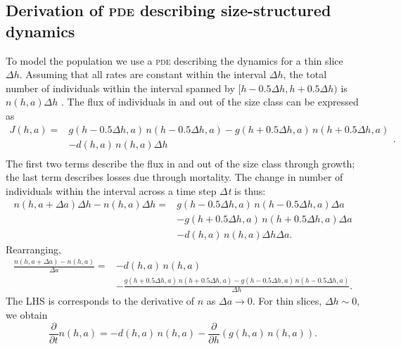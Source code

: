 \documentclass[10pt,twoside]{article}
\begin{document}
\subsection{Derivation of \textsc{pde} describing size-structured
dynamics}\label{derivation-of-pde-describing-size-structured-dynamics}

To model the population we use a \textsc{pde} describing the dynamics for a thin
slice \(\Delta h\). Assuming that all rates are constant within the
interval \(\Delta h\), the total number of individuals within the
interval spanned by \([h-0.5\Delta h,h+0.5\Delta h)\) is
\(n(h,a)\Delta h\) . The flux of individuals in and out of the size
class can be expressed as
\begin{equation}\begin{array}{ll} J(h,a)=&g(h-0.5 \Delta h,a) \, n(h-0.5 \Delta h,a)-g(h+0.5 \Delta h,a) \, n(h+0.5 \Delta h,a) \\ &-d (h,a) \, n(h,a)\Delta h\\ \end{array}.
\end{equation}
The first two terms describe the flux in and out of the size class
through growth; the last term describes losses due through mortality.
The change in number of individuals within the interval across a time
step \textit{$\Delta $t} is thus:
\begin{equation}
  \begin{array}{ll} n(h,a+\Delta a)\Delta h-n(h,a)\Delta h= &g(h-0.5 \Delta h,a) \, n(h-0.5 \Delta h,a)\Delta a \\ &-g(h+0.5 \Delta h,a) \, n(h+0.5 \Delta h,a)\Delta a\\&-d (h,a) \, n(h,a)\Delta h\Delta a.
  \end{array}
\end{equation}
Rearranging,
\begin{equation}
  \begin{array}{ll}
  \frac{n(h,a+\Delta a)-n(h,a)}{\Delta a} = &-d (h,a) \, n(h,a) \\
  &-\frac{g(h+0.5 \Delta h,a) \, n(h+0.5 \Delta h,a)-g(h-0.5 \Delta h,a) \, n(h-0.5 \Delta h,a)}{\Delta h}.
  \end{array}
\end{equation}
The LHS is corresponds to the derivative of \(n\) as \(\Delta a\to 0\).
For thin slices, \(\Delta h \sim 0\), we obtain
\begin{equation} \label{eq:PDE-app}
  \frac{\partial }{\partial t} n(h,a)=-d (h,a) \, n(h,a)-\frac{\partial }{\partial h} (g(h,a) \, n(h,a)).
\end{equation}
\end{document}
